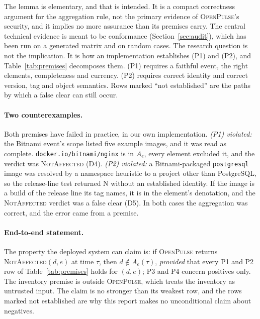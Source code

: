 \documentclass[11pt,a4paper]{article}
\newcommand{\op}{\textsc{OpenPulse}}
\newcommand{\code}[1]{\texttt{#1}}
\newcommand{\Non}{\textsf{N}}
\begin{document}
The lemma is elementary, and that is intended. It is a compact
correctness argument for the aggregation rule, not the primary
evidence of \op{}'s security, and it implies no more assurance than
its premises carry. The central technical evidence is meant to be
conformance (Section~\ref{sec:audit}), which has been run on a
generated matrix and on random cases.
The research question
is not the implication. It is how an implementation establishes
(P1) and (P2), and Table~\ref{tab:premises} decomposes them. (P1)
requires a faithful event, the right elements, completeness and
currency. (P2) requires correct identity and correct version, tag and
object semantics. Rows marked ``not established'' are the paths by
which a false clear can still occur.

\paragraph{Two counterexamples.} Both premises have failed in
practice, in our own implementation. \emph{(P1) violated:} the Bitnami
event's scope listed five example images, and it was read as complete.
\code{docker.io/bitnami/nginx} is in $A_e$, every element excluded it,
and the verdict was \textsc{NotAffected} (D4). \emph{(P2) violated:} a
Bitnami-packaged \code{postgresql} image was resolved by a namespace
heuristic to a project other than PostgreSQL, so the release-line test
returned \Non{} without an established identity. If the image is a
build of the release line its tag names, it is in the element's
denotation, and the \textsc{NotAffected} verdict was a false clear
(D5). In both cases the aggregation was correct, and the error came
from a premise.

\paragraph{End-to-end statement.} The property the deployed system can
claim is: if \op{} returns \textsc{NotAffected}$(d,e)$ at time $\tau$,
then $d \notin A_e(\tau)$, \emph{provided} that every P1 and P2 row
of Table~\ref{tab:premises} holds for $(d,e)$; P3 and P4 concern
positives only. The inventory premise is outside \op{}, which treats
the inventory as untrusted input. The claim is no stronger than its
weakest row, and the rows marked not established are why this report
makes no unconditional claim about negatives.
\end{document}
